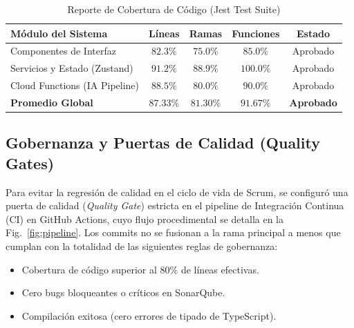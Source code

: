 \documentclass[conference]{IEEEtran}
\begin{document}
\begin{table}[htbp]
\caption{Reporte de Cobertura de Código (Jest Test Suite)}
\label{tab:pruebas}
\begin{center}
\footnotesize
\setlength{\tabcolsep}{4pt}
\begin{tabular}{lcccc}
\toprule
\textbf{Módulo del Sistema} & \textbf{Líneas} & \textbf{Ramas} & \textbf{Funciones} & \textbf{Estado} \\ \midrule
Componentes de Interfaz & $82.3\%$ & $75.0\%$ & $85.0\%$ & Aprobado \\ \addlinespace
Servicios y Estado (Zustand) & $91.2\%$ & $88.9\%$ & $100.0\%$ & Aprobado \\ \addlinespace
Cloud Functions (IA Pipeline) & $88.5\%$ & $80.0\%$ & $90.0\%$ & Aprobado \\ \addlinespace
\textbf{Promedio Global} & $\mathbf{87.33\%}$ & $\mathbf{81.30\%}$ & $\mathbf{91.67\%}$ & \textbf{Aprobado} \\
\bottomrule
\end{tabular}
\end{center}
\end{table}

\subsection{Gobernanza y Puertas de Calidad (Quality Gates)}
Para evitar la regresión de calidad en el ciclo de vida de Scrum, se configuró una puerta de calidad (\textit{Quality Gate}) estricta en el pipeline de Integración Continua (CI) en GitHub Actions, cuyo flujo procedimental se detalla en la Fig.~\ref{fig:pipeline}. Los commits no se fusionan a la rama principal a menos que cumplan con la totalidad de las siguientes reglas de gobernanza:
\begin{itemize}
    \item Cobertura de código superior al $80\%$ de líneas efectivas.
    \item Cero bugs bloqueantes o críticos en SonarQube.
    \item Compilación exitosa (cero errores de tipado de TypeScript).
\end{itemize}
\end{document}
